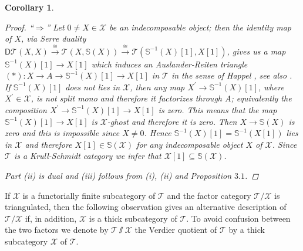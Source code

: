 \documentclass[oneside, a4paper,reqno]{amsart}
\numberwithin{equation}{section}
\newtheorem{cor}[thm]{Corollary}
\theoremstyle{definition}
\begin{document}
\begin{cor}
\begin{proof}
``$\Longrightarrow$'' Let $0 \neq X \in {\mathcal X}$ be an indecomposable object; then the identity map of $X$, via  Serre duality $\mathsf{D}{\mathcal T}(X,X) \stackrel{\cong}{\longrightarrow} {\mathcal T}(X,\mathbb S(X)) \stackrel{\cong}{\longrightarrow} {\mathcal T}(\mathbb S^{-1}(X)[1],X[1])$, gives us a map $\mathbb S^{-1}(X)[1] {\longrightarrow} X[1]$ which induces an Auslander-Reiten triangle $(*) \colon X {\longrightarrow} A {\longrightarrow} \mathbb S^{-1}(X)[1] {\longrightarrow} X[1]$ in ${\mathcal T}$ in the sense of Happel \cite{Happel}, see also \cite{VdBR}.  If $\mathbb S^{-1}(X)[1]$ does not lies in ${\mathcal X}$, then any map $X^{\prime} {\longrightarrow} \mathbb S^{-1}(X)[1]$, where $X^{\prime} \in {\mathcal X}$, is not split mono and therefore it factorizes through $A$; equivalently the composition $X^{\prime} {\longrightarrow} \mathbb S^{-1}(X)[1] {\longrightarrow} X[1]$ is zero. This means that the map $\mathbb S^{-1}(X)[1] {\longrightarrow} X[1]$ is ${\mathcal X}$-ghost and therefore it is zero. Then $X {\longrightarrow} \mathbb S(X)$ is zero and this is impossible since $X\neq 0$. Hence $\mathbb S^{-1}(X)[1] = \mathbb S^{-1}(X[1])$ lies in ${\mathcal X}$ and therefore $X[1] \in \mathbb S({\mathcal X})$ for any indecomposable object $X$ of ${\mathcal X}$. Since ${\mathcal T}$ is a Krull-Schmidt category we infer that ${\mathcal X}[1] \subseteq \mathbb S({\mathcal X})$. 

Part (ii) is dual and (iii) follows from (i), (ii) and Proposition $3.1$. 
\end{proof}
\end{cor}  

If ${\mathcal X}$ is a functorially finite subcategory of ${\mathcal T}$ and the factor category ${\mathcal T}/{\mathcal X}$ is triangulated, then the following observation gives an alternative description of ${\mathcal T}/{\mathcal X}$ if, in addition, ${\mathcal X}$ is a thick subcategory of ${\mathcal T}$. To avoid confusion between the two factors we denote by ${\mathcal T}\! \sslash \! {\mathcal X}$ the Verdier quotient of ${\mathcal T}$ by a thick subcategory ${\mathcal X}$ of ${\mathcal T}$. 

 
\end{document}
